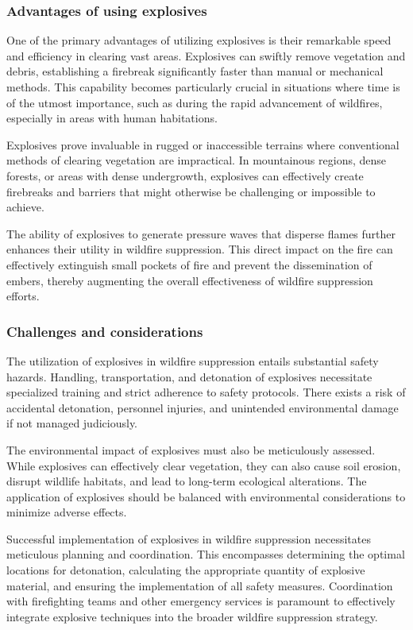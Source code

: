 \documentclass[
  12 pt,
]{Nemilov}
\begin{document}
\subsubsection{Advantages of using explosives}\label{advantages-of-using-explosives}

One of the primary advantages of utilizing explosives is their remarkable speed and efficiency in clearing vast areas. Explosives can swiftly remove vegetation and debris, establishing a firebreak significantly faster than manual or mechanical methods. This capability becomes particularly crucial in situations where time is of the utmost importance, such as during the rapid advancement of wildfires, especially in areas with human habitations.

Explosives prove invaluable in rugged or inaccessible terrains where conventional methods of clearing vegetation are impractical. In mountainous regions, dense forests, or areas with dense undergrowth, explosives can effectively create firebreaks and barriers that might otherwise be challenging or impossible to achieve.

The ability of explosives to generate pressure waves that disperse flames further enhances their utility in wildfire suppression. This direct impact on the fire can effectively extinguish small pockets of fire and prevent the dissemination of embers, thereby augmenting the overall effectiveness of wildfire suppression efforts.

\subsubsection{Challenges and considerations}\label{challenges-and-considerations}

The utilization of explosives in wildfire suppression entails substantial safety hazards. Handling, transportation, and detonation of explosives necessitate specialized training and strict adherence to safety protocols. There exists a risk of accidental detonation, personnel injuries, and unintended environmental damage if not managed judiciously.

The environmental impact of explosives must also be meticulously assessed. While explosives can effectively clear vegetation, they can also cause soil erosion, disrupt wildlife habitats, and lead to long-term ecological alterations. The application of explosives should be balanced with environmental considerations to minimize adverse effects.

Successful implementation of explosives in wildfire suppression necessitates meticulous planning and coordination. This encompasses determining the optimal locations for detonation, calculating the appropriate quantity of explosive material, and ensuring the implementation of all safety measures. Coordination with firefighting teams and other emergency services is paramount to effectively integrate explosive techniques into the broader wildfire suppression strategy.
\end{document}
